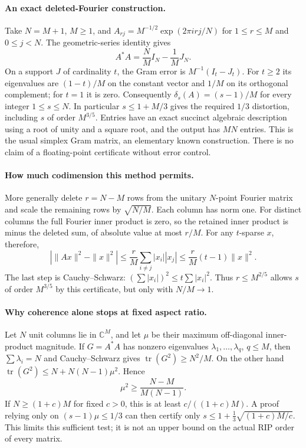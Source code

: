 \documentclass[11pt]{article}
\begin{document}
\paragraph{An exact deleted-Fourier construction.}
Take $N=M+1$, $M\ge1$, and
$A_{rj}=M^{-1/2}\exp(2\pi i rj/N)$ for $1\le r\le M$ and $0\le j<N$.
The geometric-series identity gives
\[
A^*A=\frac NM I_N-\frac1M J_N.
\]
On a support $J$ of cardinality $t$, the Gram error is
$M^{-1}(I_t-J_t)$. For $t\ge2$ its eigenvalues are $(1-t)/M$ on the
constant vector and $1/M$ on its orthogonal complement; for $t=1$ it is zero.
Consequently $\delta_s(A)=(s-1)/M$ for every integer $1\le s\le N$.
In particular $s\le1+M/3$ gives the required $1/3$ distortion, including
$s$ of order $M^{3/5}$. Entries have an exact succinct algebraic description
using a root of unity and a square root, and the output has $MN$ entries.
This is the usual simplex Gram matrix, an elementary known construction.
There is no claim of a floating-point certificate without error control.

\paragraph{How much codimension this method permits.}
More generally delete $r=N-M$ rows from the unitary $N$-point Fourier matrix
and scale the remaining rows by $\sqrt{N/M}$. Each column has norm one.
For distinct columns the full Fourier inner product is zero, so the retained
inner product is minus the deleted sum, of absolute value at most $r/M$.
For any $t$-sparse $x$, therefore,
\[
|\|Ax\|^2-\|x\|^2|
\le\frac rM\sum_{i\ne j}|x_i||x_j|
\le\frac rM(t-1)\|x\|^2.
\]
The last step is Cauchy--Schwarz: $(\sum |x_i|)^2\le t\sum|x_i|^2$.
Thus $r\le M^{2/5}$ allows $s$ of order $M^{3/5}$ by this certificate,
but only with $N/M\longrightarrow1$.

\paragraph{Why coherence alone stops at fixed aspect ratio.}
Let $N$ unit columns lie in $\mathbb C^M$, and let $\mu$ be their maximum
off-diagonal inner-product magnitude. If $G=A^*A$ has nonzero eigenvalues
$\lambda_1,\ldots,\lambda_q$, $q\le M$, then
$\sum\lambda_i=N$ and Cauchy--Schwarz gives
$\operatorname{tr}(G^2)\ge N^2/M$.
On the other hand $\operatorname{tr}(G^2)\le N+N(N-1)\mu^2$.
Hence
\[
\mu^2\ge\frac{N-M}{M(N-1)}.
\]
If $N\ge(1+c)M$ for fixed $c>0$, this is at least
$c/((1+c)M)$. A proof relying only on $(s-1)\mu\le1/3$ can then certify
only $s\le1+\frac13\sqrt{(1+c)M/c}$. This limits this sufficient test;
it is not an upper bound on the actual RIP order of every matrix.
\end{document}
